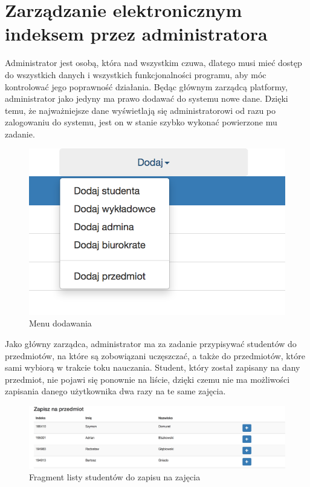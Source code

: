 \documentclass{xmgr}
\begin{document}
\section{Zarządzanie elektronicznym indeksem przez administratora}

\indent \indent \indent Administrator jest osobą, która nad wszystkim czuwa, dlatego musi mieć dostęp do wszystkich danych i wszystkich funkcjonalności programu, aby móc kontrolować jego poprawność działania. Będąc głównym zarządcą platformy, administrator jako jedyny ma prawo dodawać do systemu nowe dane. Dzięki temu, że najważniejsze dane wyświetlają się administratorowi od razu po zalogowaniu do systemu, jest on w stanie szybko wykonać powierzone mu zadanie.

\begin{figure}[th!]
\centering
\includegraphics[scale=0.6]{images/menu.png}
\caption{Menu dodawania\label{RYS.4}}
\end{figure}


\noindent Jako główny zarządca, administrator ma za zadanie przypisywać studentów do przedmiotów, na które są zobowiązani uczęszczać, a także do przedmiotów, które sami wybiorą w trakcie toku nauczania. Student, który został zapisany na dany przedmiot, nie pojawi się ponownie na liście, dzięki czemu nie ma możliwości zapisania danego użytkownika dwa razy na te same zajęcia.

\begin{figure}[th!]
\centering
\includegraphics[width=1.1\hsize]{images/addStudent}
\caption{Fragment listy studentów do zapisu na zajęcia\label{RYS.5}}
\end{figure}
\end{document}
